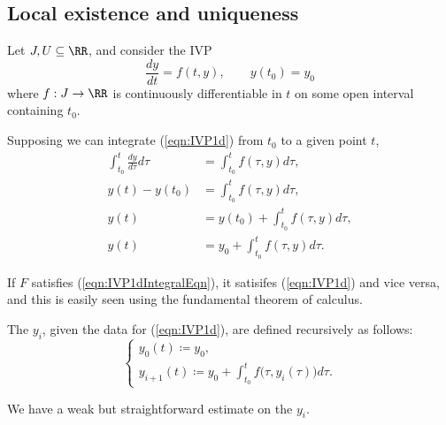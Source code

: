 \documentclass{article}
\begin{document}
\subsection{Local existence and uniqueness}


Let $J, U \subseteq \RR$, and consider the IVP
\begin{equation}
    \label{eqn:IVP1d}
    \tag{IVP-$1$D}
    \frac{dy}{dt} = f(t,y),\qquad
    y(t_0)=y_0
\end{equation}
where $f: J \to \RR$ is continuously differentiable in $t$ on some open interval containing $t_0$.

Supposing we can integrate (\ref{eqn:IVP1d}) from $t_0$ to a given point $t$,
\begin{align*}
    \int_{t_0}^t \frac{dy}{d\tau}d\tau
    &=
    \int_{t_0}^t f(\tau, y)d\tau, \\
    y(t)-y(t_0)
    &=
    \int_{t_0}^t f(\tau, y)d\tau, \\
    \label{eqn:IVP1dIntegralEqn}
    \tag{$\int$IVP-$1$D}
    y(t)
    &=
    y(t_0) + \int_{t_0}^t f(\tau, y)d\tau, \\
    y(t)
    &=
    y_0 + \int_{t_0}^t f(\tau, y)d\tau.
\end{align*}

If $F$ satisfies (\ref{eqn:IVP1dIntegralEqn}), it satisifes (\ref{eqn:IVP1d}) and vice versa, and this is easily seen using the fundamental theorem of calculus.

\begin{definition}
    The  $y_i$, given the data for (\ref{eqn:IVP1d}), are defined recursively as follows:
    \begin{equation}
        \label{eqn:PicardIter}
        \tag{Picard}
        \begin{cases}
            y_0(t) \coloneq y_0, \\
            y_{i+1}(t) \coloneq y_0 + \int_{t_0}^tf\big(\tau,y_i(\tau)\big)d\tau.
        \end{cases}
    \end{equation}
\end{definition}

We have a weak but straightforward estimate on the $y_i$.
\end{document}
